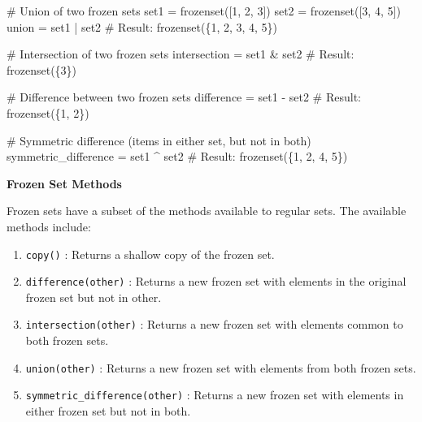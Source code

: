 \documentclass[
  letterpaper,
  DIV=11,
  numbers=noendperiod]{scrreprt}
\newenvironment{Shaded}{\begin{snugshade}}{\end{snugshade}}
\newcommand{\BuiltInTok}[1]{\textcolor[rgb]{0.00,0.23,0.31}{#1}}
\newcommand{\CommentTok}[1]{\textcolor[rgb]{0.37,0.37,0.37}{#1}}
\newcommand{\DecValTok}[1]{\textcolor[rgb]{0.68,0.00,0.00}{#1}}
\newcommand{\NormalTok}[1]{\textcolor[rgb]{0.00,0.23,0.31}{#1}}
\newcommand{\OperatorTok}[1]{\textcolor[rgb]{0.37,0.37,0.37}{#1}}
\providecommand{\tightlist}{%
  \setlength{\itemsep}{0pt}\setlength{\parskip}{0pt}}\usepackage{longtable,booktabs,array}
\theoremstyle{plain}
\theoremstyle{definition}
\theoremstyle{remark}
\begin{document}
\begin{Shaded}
\begin{Highlighting}[]
\CommentTok{\# Union of two frozen sets}
\NormalTok{set1 }\OperatorTok{=} \BuiltInTok{frozenset}\NormalTok{([}\DecValTok{1}\NormalTok{, }\DecValTok{2}\NormalTok{, }\DecValTok{3}\NormalTok{])}
\NormalTok{set2 }\OperatorTok{=} \BuiltInTok{frozenset}\NormalTok{([}\DecValTok{3}\NormalTok{, }\DecValTok{4}\NormalTok{, }\DecValTok{5}\NormalTok{])}
\NormalTok{union }\OperatorTok{=}\NormalTok{ set1 }\OperatorTok{|}\NormalTok{ set2  }\CommentTok{\# Result: frozenset(\{1, 2, 3, 4, 5\})}

\CommentTok{\# Intersection of two frozen sets}
\NormalTok{intersection }\OperatorTok{=}\NormalTok{ set1 }\OperatorTok{\&}\NormalTok{ set2  }\CommentTok{\# Result: frozenset(\{3\})}

\CommentTok{\# Difference between two frozen sets}
\NormalTok{difference }\OperatorTok{=}\NormalTok{ set1 }\OperatorTok{{-}}\NormalTok{ set2  }\CommentTok{\# Result: frozenset(\{1, 2\})}

\CommentTok{\# Symmetric difference (items in either set, but not in both)}
\NormalTok{symmetric\_difference }\OperatorTok{=}\NormalTok{ set1 }\OperatorTok{\^{}}\NormalTok{ set2  }\CommentTok{\# Result: frozenset(\{1, 2, 4, 5\})}
\end{Highlighting}
\end{Shaded}

\textbf{Frozen Set Methods}

Frozen sets have a subset of the methods available to regular sets. The
available methods include:

\begin{enumerate}
\def\labelenumi{\arabic{enumi}.}
\tightlist
\item
  \texttt{copy()} : Returns a shallow copy of the frozen set.
\item
  \texttt{difference(other)} : Returns a new frozen set with elements in
  the original frozen set but not in other.
\item
  \texttt{intersection(other)} : Returns a new frozen set with elements
  common to both frozen sets.
\item
  \texttt{union(other)} : Returns a new frozen set with elements from
  both frozen sets.
\item
  \texttt{symmetric\_difference(other)} : Returns a new frozen set with
  elements in either frozen set but not in both.
\end{enumerate}
\end{document}
